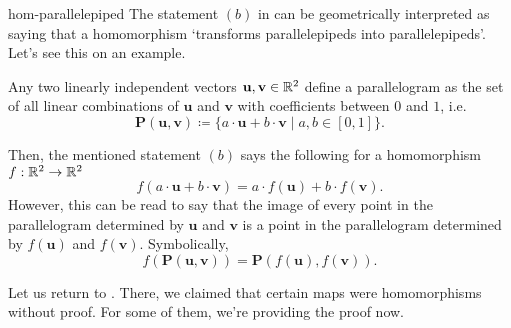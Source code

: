\begin{remark}{}{hom-parallelepiped}
 The statement $(b)$ in  can be
 geometrically interpreted as saying that a homomorphism `transforms
 parallelepipeds into parallelepipeds'. Let's see this on an example.

 Any two linearly independent vectors $\mathbf{u},\mathbf{v} \in \mathbb{R}^2$ define a
 parallelogram as the set of all linear combinations of $\mathbf{u}$ and
 $\mathbf{v}$ with coefficients between $0$ and $1$, i.e.
 \[
  \mathbf{P}(\mathbf{u},\mathbf{v}) \coloneqq \{a \cdot \mathbf{u} + b \cdot
  \mathbf{v} \mid a,b \in [0,1]\}.
 \]
 \begin{center}
 \end{center}
 Then, the mentioned statement $(b)$ says the following for a homomorphism
 $f:\mathbb{R}^2 \to \mathbb{R}^2$
 \[
  f(a \cdot \mathbf{u} + b \cdot \mathbf{v}) = a \cdot f(\mathbf{u}) + b \cdot
  f(\mathbf{v}).
 \]
 However, this can be read to say that the image of every point in the
 parallelogram determined by $\mathbf{u}$ and $\mathbf{v}$ is a point in the
 parallelogram determined by $f(\mathbf{u})$ and $f(\mathbf{v})$. Symbolically,
 \[
  f(\mathbf{P}(\mathbf{u},\mathbf{v})) =
  \mathbf{P}(f(\mathbf{u}),f(\mathbf{v})).
 \]
\end{remark}

Let us return to . There, we claimed that certain maps
were homomorphisms without proof. For some of them, we're providing the proof
now.

